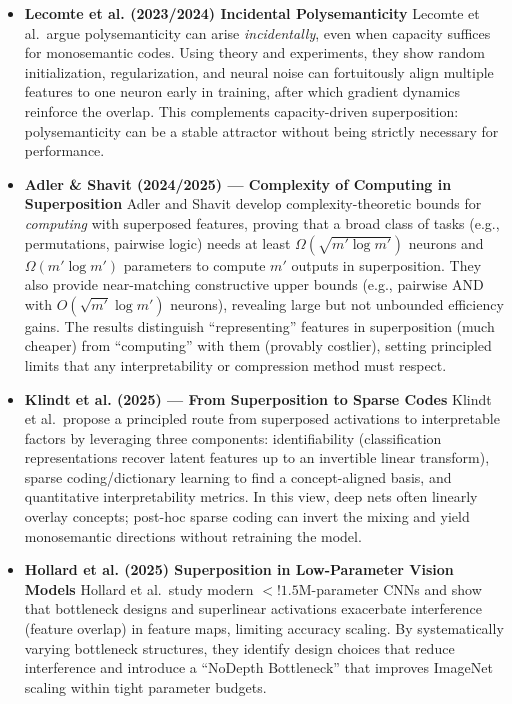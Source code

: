 \documentclass{article}
\theoremstyle{plain}
\numberwithin{equation}{section}
\theoremstyle{definition}
\theoremstyle{remark}
\begin{document}
\begin{itemize}

\item \textbf{Lecomte et al. (2023/2024) \cite{lecomte2023incidental} Incidental Polysemanticity}
Lecomte et al.\ argue polysemanticity can arise \emph{incidentally}, even when capacity suffices for monosemantic codes. Using theory and experiments, they show random initialization, regularization, and neural noise can fortuitously align multiple features to one neuron early in training, after which gradient dynamics reinforce the overlap. This complements capacity-driven superposition: polysemanticity can be a stable attractor without being strictly necessary for performance.

\item \textbf{Adler \& Shavit (2024/2025) \cite{adler2024complexity} — Complexity of Computing in Superposition}
Adler and Shavit develop complexity-theoretic bounds for \emph{computing} with superposed features, proving that a broad class of tasks (e.g., permutations, pairwise logic) needs at least $\Omega(\sqrt{m'\log m'})$ neurons and $\Omega(m'\log m')$ parameters to compute $m'$ outputs in superposition. They also provide near-matching constructive upper bounds (e.g., pairwise AND with $O(\sqrt{m'}\log m')$ neurons), revealing large but not unbounded efficiency gains. The results distinguish “representing” features in superposition (much cheaper) from “computing” with them (provably costlier), setting principled limits that any interpretability or compression method must respect.

\item \textbf{Klindt et al. (2025) \cite{klindt2025sparsecodes} — From Superposition to Sparse Codes}
Klindt et al.\ propose a principled route from superposed activations to interpretable factors by leveraging three components: identifiability (classification representations recover latent features up to an invertible linear transform), sparse coding/dictionary learning to find a concept-aligned basis, and quantitative interpretability metrics. In this view, deep nets often linearly overlay concepts; post-hoc sparse coding can invert the mixing and yield monosemantic directions without retraining the model.

\item \textbf{Hollard et al. (2025) \cite{hollard2025lowparam} Superposition in Low-Parameter Vision Models}
Hollard et al.\ study modern $<!1.5$M-parameter CNNs and show that bottleneck designs and superlinear activations exacerbate interference (feature overlap) in feature maps, limiting accuracy scaling. By systematically varying bottleneck structures, they identify design choices that reduce interference and introduce a “NoDepth Bottleneck” that improves ImageNet scaling within tight parameter budgets.


\end{itemize}
\end{document}
